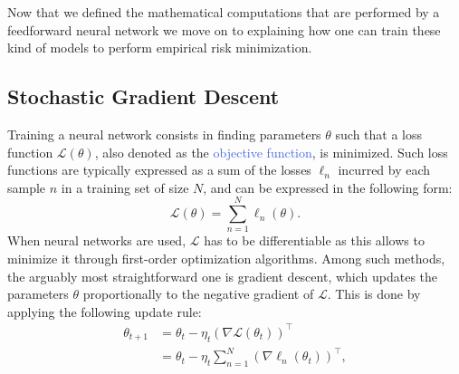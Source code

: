 Now that we defined the mathematical computations that are performed by a feedforward neural network we move on to explaining how one can train these kind of models to perform empirical risk minimization.

\subsection{Stochastic Gradient Descent}
\label{sec:sgd}

Training a neural network consists in finding parameters $\theta$ such that a loss function $\mathscr{L}(\theta)$, also denoted as the \textcolor{RoyalBlue}{objective function}, is minimized. Such loss functions are typically expressed as a sum of the losses $\ell_n$ incurred by each sample $n$ in a training set of size $N$, and can be expressed in the following form:
\begin{equation}
	\mathscr{L}(\theta) = \sum_{n=1}^{N}\ell_n(\theta).
	\label{eq:sum_of_losses}
\end{equation}
When neural networks are used, $\mathscr{L}$ has to be differentiable as this allows to minimize it through first-order optimization algorithms. Among such methods, the arguably most straightforward one is gradient descent, which updates the parameters $\theta$ proportionally to the negative gradient of $\mathscr{L}$. This is done by applying the following update rule:
\begin{equation}
	\begin{split}
	\theta_{t+1} & = \theta_t - \eta_t(\nabla\mathscr{L}(\theta_t))^{\intercal} \\ 
	& = \theta_t - \eta_t \sum_{n=1}^{N}(\nabla \ell_n(\theta_t))^{\intercal},
	\end{split}
	\label{eq:gradient_descent_1}
\end{equation}
